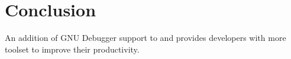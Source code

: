 \chapter{Conclusion}
An addition of GNU Debugger support to \uCPPS and \CFAS provides
developers with more toolset to improve their productivity.
